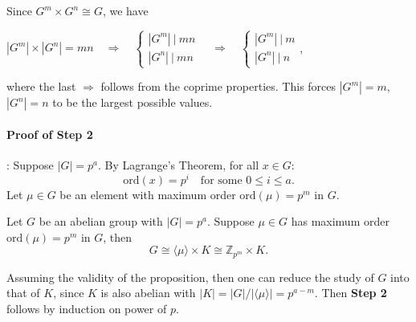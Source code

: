 \begin{itemize}
    Since $G^m \times G^n \cong G$, we have 
    \begin{center}
    $|G^m| \times |G^n| = mn \quad \Rightarrow \quad \begin{cases} |G^m|\ |\ mn \\ 
    |G^n|\ |\ mn \end{cases} \quad \Rightarrow \quad \begin{cases} |G^m|\ |\ m\\ |G^n|\ |\ n \end{cases}$,    
    \end{center}
    where the last $\Rightarrow$ follows from the coprime properties. This forces $|G^m| = m$, $|G^n| = n$ to be the largest possible values.
\end{itemize}

\paragraph{Proof of Step 2}:
Suppose $|G| = p^a$. By Lagrange's Theorem, for all $x \in G$:
\[ \text{ord}(x) = p^i \quad \text{for some } 0 \le i \le a. \]
Let $\mu \in G$ be an element with maximum order $\text{ord}(\mu) = p^m$ in $G$.

\begin{proposition}
Let $G$ be an abelian group with $|G| = p^a$. Suppose $\mu \in G$ has maximum order $\text{ord}(\mu) = p^m$ in $G$, then 
\[ G \cong \langle \mu \rangle \times K \cong \mathbb{Z}_{p^m} \times K. \]
\end{proposition}
Assuming the validity of the proposition, then one can reduce the study of $G$ into that of $K$, since $K$ is also abelian with $|K| = |G|/|\langle \mu \rangle| = p^{a-m}$. Then {\bf Step 2} follows by induction on power of $p$.


